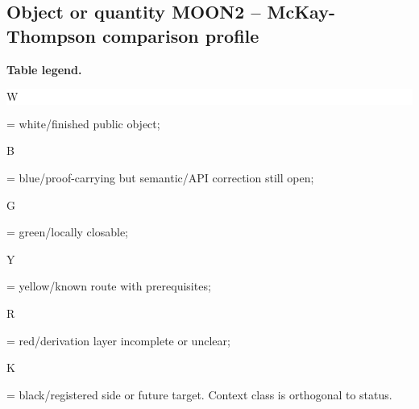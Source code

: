 \subsection*{Object or quantity MOON2 -- McKay-Thompson comparison profile}
\hypertarget{objproof:MOON2}{}
\par\smallskip\noindent\begin{minipage}{0.99\linewidth}\footnotesize\raggedright\textbf{Table legend.} \colorbox{white}{\strut W} = white/finished public object; \colorbox{cyan!20}{\strut B} = blue/proof-carrying but semantic/API correction still open; \colorbox{green!18}{\strut G} = green/locally closable; \colorbox{yellow!25}{\strut Y} = yellow/known route with prerequisites; \colorbox{red!20}{\strut R} = red/derivation layer incomplete or unclear; \colorbox{black!18}{\strut K} = black/registered side or future target. Context class is orthogonal to status.\end{minipage}\par\vspace{0.25em}
